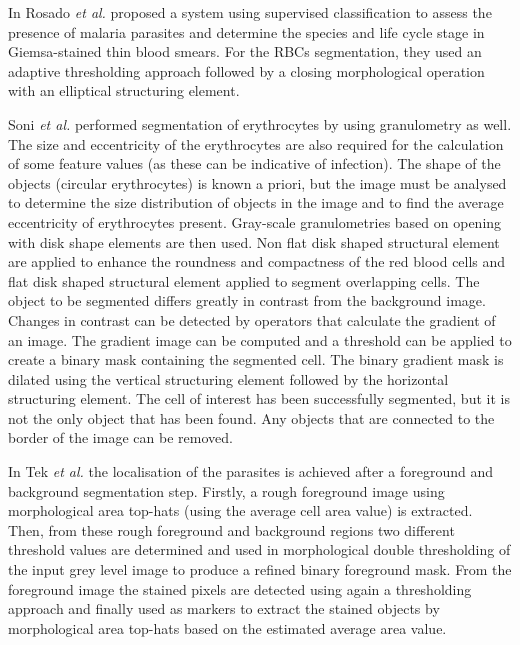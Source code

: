 \documentclass[sensors,review,submit,moreauthors,pdftex,10pt,a4paper]{mdpi}
\begin{document}
In \cite{Rosado2017} Rosado \emph{et al.} proposed a system using supervised classification to assess the presence of malaria parasites and determine the species and life cycle stage in Giemsa-stained thin blood smears. For the RBCs segmentation, they used an adaptive thresholding approach followed by a closing morphological operation with an elliptical structuring element.

Soni \emph{et al.} \cite{Soni2011} performed segmentation of erythrocytes by using granulometry as well. The size and eccentricity of the erythrocytes are also required for the calculation of some feature values (as these can be indicative of infection). The shape of the objects (circular erythrocytes) is known a priori, but the image must be analysed to determine the size distribution of objects in the image and to find the average eccentricity of erythrocytes present.
Gray-scale granulometries based on opening with disk shape elements are then used. Non flat disk shaped structural element are applied to enhance the roundness and compactness of the red blood cells and flat disk shaped structural element applied to segment overlapping cells. The object to be segmented differs greatly in contrast from the background image. Changes in contrast can be detected by operators that calculate the gradient of an image. The gradient image can be computed and a threshold can be applied to create a binary mask containing the segmented cell. The binary gradient mask is dilated using the vertical structuring element followed by the horizontal structuring element. The cell of interest has been successfully segmented, but it is not the only object that has been found. Any objects that are connected to the border of the image can be removed.

In \cite{Tek2010} Tek \emph{et al.} the localisation of the parasites is achieved after a foreground and background segmentation step. Firstly, a rough foreground image using morphological area top-hats (using the average cell area value) is extracted. Then, from these rough foreground and background regions two different threshold values are determined and used in morphological double thresholding of the input grey level image to produce a refined binary foreground mask. From the foreground image the stained pixels are detected using again a thresholding approach and finally used as markers to extract the stained objects by morphological area top-hats based on the estimated average area value.
\end{document}
